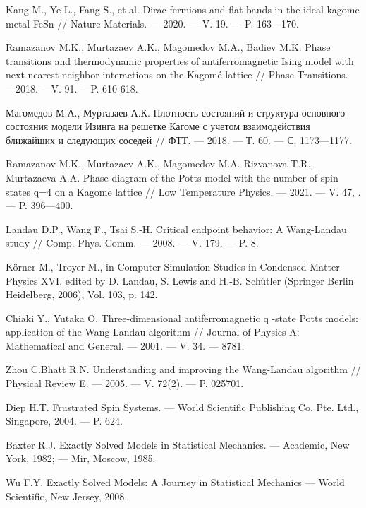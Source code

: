 \begin{thebibliography}{111}
  Kang M., Ye L., Fang S., et al.
  Dirac fermions and flat bands in the ideal kagome metal FeSn
  //
  Nature Materials.
  --- 2020.
  --- V. 19.
  --- P. 163---170.
  
  Ramazanov M.K., Murtazaev A.K., Magomedov M.A., Badiev M.K.
  Phase transitions and thermodynamic properties of antiferromagnetic Ising model with next-nearest-neighbor interactions on the Kagomé lattice
  //
  Phase Transitions. ---2018. ---V. 91. ---P. 610-618.
  
  Магомедов М.А., Муртазаев А.К.
  Плотность состояний и структура основного состояния модели Изинга на решетке Кагоме с учетом взаимодействия ближайших и следующих соседей
  //
  ФТТ.
  --- 2018.
  --- Т. 60.
  --- С. 1173---1177.
  
  Ramazanov M.K., Murtazaev A.K., Magomedov M.A. Rizvanova T.R., Murtazaeva A.A.
  Phase diagram of the Potts model with the number of spin states q=4 on a Kagome lattice
  //
  Low Temperature Physics.
  --- 2021.
  --- V. 47, .
  --- P. 396---400.
  
  Landau D.P., Wang F., Tsai S.-H.
  Critical endpoint behavior: A Wang-Landau study
  //
  Comp. Phys. Comm.
  --- 2008.
  --- V. 179.
  --- P. 8.
  
  Körner M., Troyer M., in Computer Simulation Studies in Condensed-Matter Physics XVI, edited by D. Landau, S. Lewis and H.-B. Schütler (Springer Berlin Heidelberg, 2006), Vol. 103, p. 142.
  
  Chiaki Y., Yutaka O.
  Three-dimensional antiferromagnetic q -state Potts models: application of the Wang-Landau algorithm
  //
  Journal of Physics A: Mathematical and General.
  --- 2001.
  --- V. 34.
  --- 8781.
  
  Zhou C.Bhatt R.N.
  Understanding and improving the Wang-Landau algorithm
  //
  Physical Review E.
  --- 2005.
  --- V. 72(2).
  --- P. 025701.



  Diep H.T.
  Frustrated Spin Systems.
  --- World Scientific Publishing Co. Pte. Ltd., Singapore, 2004. 
  --- P. 624.
  
  Baxter R.J.
  Exactly Solved Models in Statistical Mechanics.
  --- Academic, New York, 1982;
  --- Mir, Moscow, 1985.
  
  Wu F.Y.
  Exactly Solved Models: A Journey in Statistical Mechanics 
  --- World Scientific, New Jersey, 2008.
  

\end{thebibliography}
